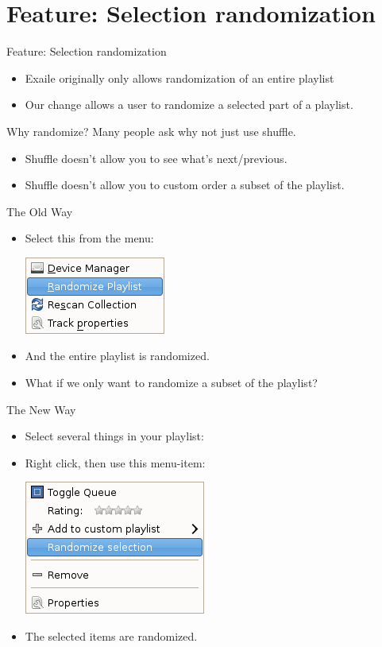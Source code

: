 \documentclass{beamer}
\begin{document}
\section{Feature: Selection randomization}

\begin{frame}{Feature: Selection randomization}
  \begin{itemize}
     \item Exaile originally only allows randomization of an entire playlist
     \item Our change allows a user to randomize a selected part of a playlist.
  \end{itemize}
\end{frame}

\begin{frame}{Why randomize?}
  Many people ask why not just use shuffle.
  \begin{itemize}
    \item Shuffle doesn't allow you to see what's next/previous.
	\item Shuffle doesn't allow you to custom order a subset of the playlist.
  \end{itemize}
\end{frame}

\begin{frame}{The Old Way}
  \begin{itemize}
    \item Select this from the menu:

    \includegraphics[keepaspectratio]{images/tools-menu.png}
    \item And the entire playlist is randomized.
	\item What if we only want to randomize a subset of the playlist?
  \end{itemize}
\end{frame}

\begin{frame}{The New Way}
  \begin{itemize}
  \item Select several things in your playlist:
  \item Right click, then use this menu-item:

    \includegraphics[keepaspectratio]{images/randomize-menu-item.png}
  \item The selected items are randomized.
  \end{itemize}
\end{frame}
\end{document}
